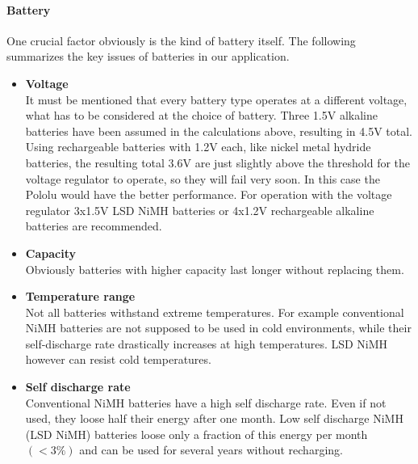 \paragraph{Battery}
One crucial factor obviously is the kind of battery itself. The following summarizes the key issues of batteries in our application.
\begin{itemize}
\item \textbf{Voltage}\\
It must be mentioned that every battery type operates at a different voltage, what has to be considered at the choice of battery.
Three 1.5V alkaline batteries have been assumed in the calculations above, resulting in 4.5V total. Using rechargeable batteries with 1.2V each, like nickel metal hydride batteries, the resulting total 3.6V are just slightly above the threshold for the voltage regulator to operate, so they will fail very soon. In this case the Pololu would have the better performance. For operation with the voltage regulator 3x1.5V LSD NiMH batteries or 4x1.2V rechargeable alkaline batteries are recommended.

\item \textbf{Capacity}\\
Obviously batteries with higher capacity last longer without replacing them.

\item \textbf{Temperature range}\\
Not all batteries withstand extreme temperatures. For example conventional NiMH batteries are not supposed to be used in cold environments, while their self-discharge rate drastically increases at high temperatures. LSD NiMH however can resist cold temperatures.

\item \textbf{Self discharge rate}\\
Conventional NiMH batteries have a high self discharge rate. Even if not used, they loose half their energy after one month. Low self discharge NiMH (LSD NiMH) batteries loose only a fraction of this energy per month $(<3\%)$ and can be used for several years without recharging.
\end{itemize}


